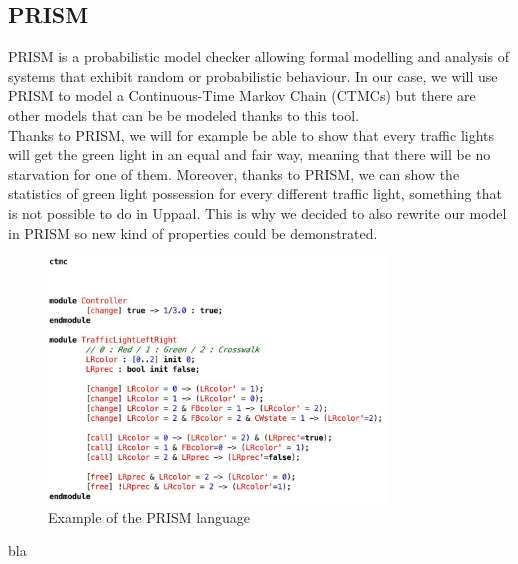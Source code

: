  \subsection{PRISM}
 PRISM is a probabilistic model checker allowing formal modelling and analysis of systems that exhibit random or probabilistic behaviour. In our case, we will use PRISM to model a Continuous-Time Markov Chain (CTMCs) but there are other models that can be be modeled thanks to this tool. \\
 Thanks to PRISM, we will for example be able to show that every traffic lights will get the green light in an equal and fair way, meaning that there will be no starvation for one of them. Moreover, thanks to PRISM, we can show the statistics of green light possession for every different traffic light, something that is not possible to do in Uppaal. This is why we decided to also rewrite our model in PRISM so new kind of properties could be demonstrated.
 \begin{figure}[h]\label{fig:prism}
  \begin{center}
    \includegraphics[width=0.8\textwidth]{picture/prism.png}
    \caption{Example of the PRISM language}
  \end{center}
\end{figure} 
bla

